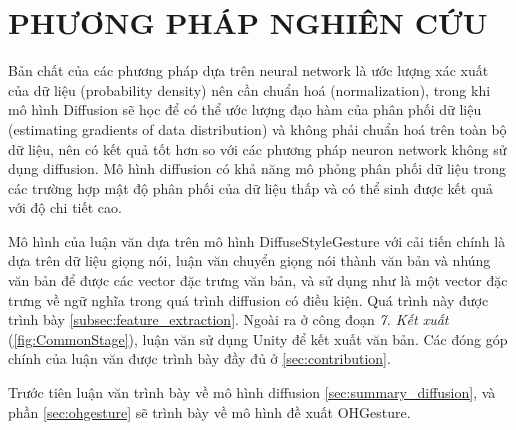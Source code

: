 %   

\chapter{PHƯƠNG PHÁP NGHIÊN CỨU}
\label{chap:Chapter3}

Bản chất của các phương pháp dựa trên neural network là ước lượng xác xuất của dữ liệu (probability density) nên cần chuẩn hoá (normalization), trong khi mô hình Diffusion sẽ học để có thể ước lượng đạo hàm của phân phối dữ liệu \cite{song2021score} (estimating gradients of data distribution) và không phải chuẩn hoá trên toàn bộ dữ liệu, nên có kết quả tốt hơn so với các phương pháp neuron network không sử dụng diffusion. Mô hình diffusion có khả năng mô phỏng phân phối dữ liệu trong các trường hợp mật độ phân phối của dữ liệu thấp và có thể sinh được kết quả với độ chi tiết cao.

Mô hình của luận văn dựa trên mô hình DiffuseStyleGesture \cite{yang2022DiffuseStyleGestureplus} với cải tiến chính là dựa trên dữ liệu giọng nói, luận văn chuyển giọng nói thành văn bản và nhúng văn bản để được các vector đặc trưng văn bản, và sử dụng như là một vector đặc trưng về ngữ nghĩa trong quá trình diffusion có điều kiện. Quá trình này được trình bày \autoref{subsec:feature_extraction}. Ngoài ra ở công đoạn \textit{7. Kết xuất}  (\autoref{fig:CommonStage}), luận văn sử dụng Unity để kết xuất văn bản. Các đóng góp chính của luận văn được trình bày đầy đủ ở \autoref{sec:contribution}.

Trước tiên luận văn trình bày về mô hình diffusion \autoref{sec:summary_diffusion}, và phần \autoref{sec:ohgesture} sẽ trình bày về mô hình đề xuất OHGesture. 


